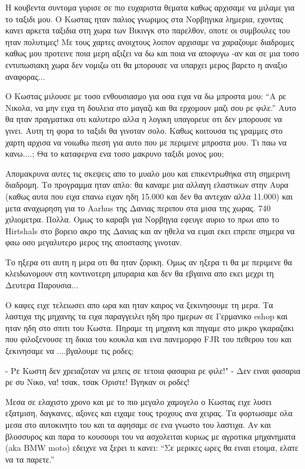Η κουβεντα συντομα γυρισε σε πιο ευχαριστα θεματα καθως αρχισαμε να μιλαμε για το ταξιδι μου. 
Ο Κωστας ηταν παλιος γνωριμος στα Νορβηγικα λημερια, εχοντας κανει αρκετα ταξιδια στη χωρα των Βικινγκ στο παρελθον, οποτε οι συμβουλες του ηταν πολυτιμες! Με τους χαρτες ανοιχτους λοιπον αρχισαμε να χαραζουμε διαδρομες καθως μου προτεινε ποια μερη αξιζει να δω και ποια να αποφυγω -αν και σε μια τοσο εντυπωσιακη χωρα δεν νομιζω οτι θα μπορουσε να υπαρχει μερος βαρετο η αναξιο αναφορας...

Ο Κωστας μιλουσε με τοσο ενθουσιασμο για οσα ειχα να δω μπροστα μου: ``Α ρε Νικολα, να μην ειχα τη δουλεια στο μαγαζι και θα ερχομουν μαζι σου ρε φιλε.''
Αυτο θα ηταν πραγματικα οτι καλυτερο αλλα η λογικη υπαγορευε οτι δεν μπορουσε να γινει. Αυτη τη φορα το ταξιδι θα γινοταν σολο. 
Καθως κοιτουσα τις γραμμες στο χαρτη αρχισα να νοιωθω πιεση για αυτο που με περιμενε μπροστα μου. Τι παω να κανω....; Θα το καταφερνα ενα τοσο μακρυνο ταξιδι μονος μου; 

Απομακρυνα αυτες τις σκεψεις απο το μυαλο μου και επικεντρωθηκα στη σημερινη διαδρομη. Το προγραμμα ηταν απλο: θα καναμε μια αλλαγη ελαστικων στην Αυρα (καθως αυτα που ειχα επανω ειχαν ηδη 15.000 και δεν θα αντεχαν αλλα 11.000) και μετα αναχωρηση για το Aarhus της Δανιας περιπου στα μισα της χωρας. 
740 χιλιομετρα. 
Πολλα. 
Ομως το καραβι για Νορβηγια εφευγε αυριο το πρωι απο το Hirtshals στο βορειο ακρο της Δανιας και αν ηθελα να ειμαι εκει επρεπε σημερα να φαω οσο μεγαλυτερο μερος της αποστασης γινοταν.


Το ηξερα οτι αυτη η μερα οτι θα ηταν ζορικη. Ομως αν ηξερα τι θα με περιμενε θα κλειδωνομουν στη κοντινοτερη μπυραρια και δεν θα εβγαινα απο εκει μεχρι τη Δευτερα Παρουσια... 

Ο καφες ειχε τελειωσει απο ωρα και ηταν καιρος να ξεκινησουμε τη μερα.
Τα λαστιχα της μηχανης τα ειχα παραγγειλει ηδη προ ημερων σε Γερμανικο eshop και ηταν ηδη στο σπιτι του Κωστα. Πηραμε τη μηχανη και πηγαμε στο μικρο γκαραζακι που φιλοξενουσε τη δικια του κουκλα και ενα πανεμορφο FJR του πεθερου του και ξεκινησαμε να ....βγαλουμε τις ροδες; 

- Ρε Κωστη δεν χρειαζοταν να μπεις σε τετοια φασαρια ρε φιλε!"
- Δεν ειναι φασαρια ρε συ Νικο, να! {τσακ, τσακ} Οριστε! Βγηκαν οι ροδες!


Μεσα σε ελαχιστο χρονο και με το πιο μεγαλο χαμογελο ο Κωστας ειχε λυσει εξατμιση, δαγκανες, αξονες και ειχαμε τους τροχους ανα χειρας. Τα φορτωσαμε ολα μεσα στο αυτοκινητο του και τα αφησαμε σε ενα γνωστο του λαστιχα. Aν και βλοσσυρος και παρα το κουσουρι του να ασχολειται κυριως με αγροτικα μηχανηματα (aka BMW moto) εδειχνε να ξερει τι κανει: ``Σε μερικες ωρες θα ειναι ετοιμα, ελατε να τα παρετε.''

